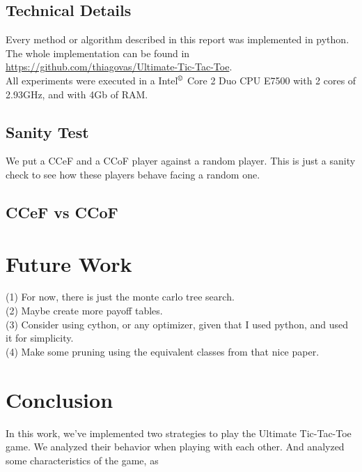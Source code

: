 \documentclass[10pt]{article}
\begin{document}
\subsection{Technical Details}
Every method or algorithm described in this report was implemented in python. The whole implementation can be found in \url{https://github.com/thiagovas/Ultimate-Tic-Tac-Toe}.\\
All experiments were executed in a Intel$^\copyright$ Core {\tiny\texttrademark} 2 Duo CPU E7500 with 2 cores of 2.93GHz, and with 4Gb of RAM.

\subsection{Sanity Test}
We put a CCeF and a CCoF player against a random player. This is just a sanity check to see how these players behave facing a random one.



\subsection{CCeF vs CCoF}



\section{Future Work}

(1) For now, there is just the monte carlo tree search.\\
(2) Maybe create more payoff tables.\\
(3) Consider using cython, or any optimizer, given that I used python, and used it for simplicity.\\
(4) Make some pruning using the equivalent classes from that nice paper.


\section{Conclusion}
In this work, we've implemented two strategies to play the Ultimate Tic-Tac-Toe game. We analyzed their behavior when playing with each other. And analyzed some characteristics of the game, as 


{}

\end{document}
